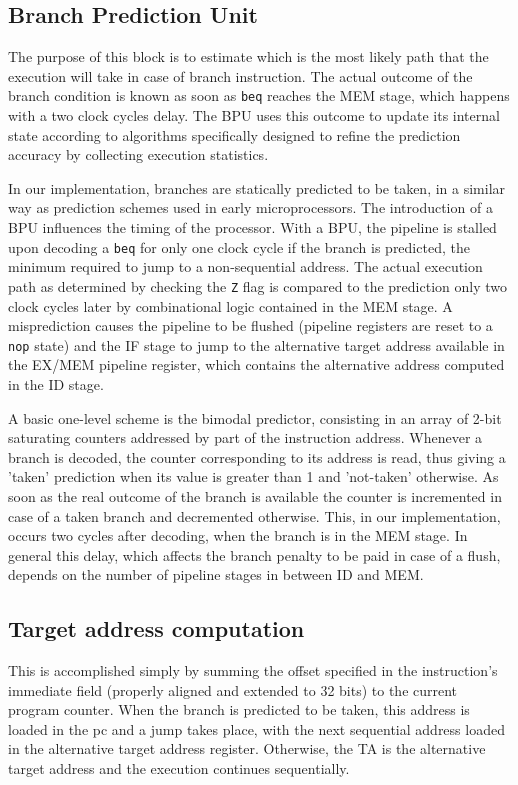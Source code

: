 \subsection{Branch Prediction Unit} The purpose of this block is to estimate which is the most likely path that the execution will take in case of branch instruction. The actual outcome of the branch condition is known as soon as \texttt{beq} reaches the MEM stage, which happens with a two clock cycles delay. The BPU uses this outcome to update its internal state according to algorithms specifically designed to refine the prediction accuracy by collecting execution statistics.

In our implementation, branches are statically predicted to be taken, in a similar way as prediction schemes used in early microprocessors. The introduction of a BPU influences the timing of the processor. With a BPU, the pipeline is stalled upon decoding a \texttt{beq} for only one clock cycle if the branch is predicted, the minimum required to jump to a non-sequential address. The actual execution path as determined by checking the \texttt{Z} flag is compared to the prediction only two clock cycles later by combinational logic contained in the MEM stage. A misprediction causes the pipeline to be flushed (pipeline registers are reset to a \texttt{nop} state) and the IF stage to jump to the alternative target address available in the EX/MEM pipeline register, which contains the alternative address computed in the ID stage.

A basic one-level scheme is the bimodal predictor, consisting in an array of 2-bit saturating counters addressed by part of the instruction address. Whenever a branch is decoded, the counter corresponding to its address is read, thus giving a 'taken' prediction when its value is greater than 1 and 'not-taken' otherwise. As soon as the real outcome of the branch is available the counter is incremented in case of a taken branch and decremented otherwise. This, in our implementation, occurs two cycles after decoding, when the branch is in the MEM stage. In general this delay, which affects the branch penalty to be paid in case of a flush, depends on the number of pipeline stages in between ID and MEM.


\subsection{Target address computation} This is accomplished simply by summing the offset specified in the instruction's immediate field (properly aligned and extended to 32 bits) to the current program counter. When the branch is predicted to be taken, this address is loaded in the pc and a jump takes place, with the next sequential address loaded in the alternative target address register. Otherwise, the TA is the alternative target address and the execution continues sequentially.

